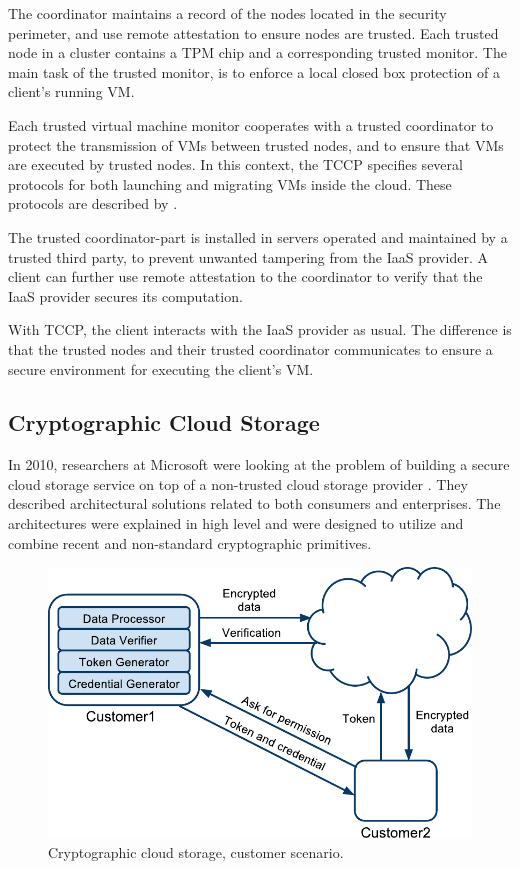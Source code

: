 \documentclass[pdftex,english,10pt,b5paper,twoside]{book}
\begin{document}
The coordinator maintains a record of the nodes located in the security
perimeter, and use remote attestation to ensure nodes are trusted. Each trusted
node in a cluster contains a \ac{TPM} chip and a corresponding trusted monitor.
The main task of the trusted monitor, is to enforce a local closed box
protection of a client's running \ac{VM}.

Each trusted virtual machine monitor cooperates with a trusted coordinator to
protect the transmission of \acp{VM} between trusted nodes, and to ensure that
\acp{VM} are executed by trusted nodes. In this context, the \ac{TCCP}
specifies several protocols for both launching and migrating \acp{VM} inside
the cloud. These protocols are described by \citet{tccp}.

The trusted coordinator-part is installed in servers operated and maintained by a
trusted third party, to prevent unwanted tampering from the \ac{IaaS} provider.
A client can further use remote attestation to the coordinator to verify that the
\ac{IaaS} provider secures its computation.

With \ac{TCCP}, the client interacts with the \ac{IaaS} provider as usual. The
difference is that the trusted nodes and their trusted coordinator communicates
to ensure a secure environment for executing the client's \ac{VM}.

\subsection{Cryptographic Cloud Storage}

In 2010, researchers at Microsoft were looking at the problem of building a
secure cloud storage service on top of a non-trusted cloud storage provider
\cite{microsoftresearch}. They described architectural solutions related to
both consumers and enterprises. The architectures were explained in high level
and were designed to utilize and combine recent and non-standard cryptographic
primitives.

\begin{figure}[h!]
    \centering
    \includegraphics[scale=0.6]{ArchitectureCCSC.pdf}
    \caption{Cryptographic cloud storage, customer scenario.}
    \label{fig:RW:CCS:CA}
\end{figure}
\end{document}
